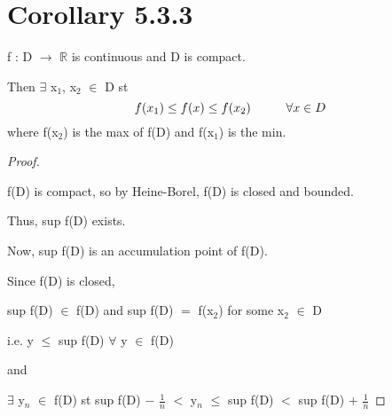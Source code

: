 \documentclass{article}
\newcommand{\mt}[1]{\ensuremath{#1}}
\newcommand\bsc[2][\DefaultOpt]{%
  \def\DefaultOpt{#2}%
  \section[#1]{#2}%
}
\newcommand{\bgpf}{\begin{proof} $ $\newline}
\newcommand{\epf}{\end{proof}}
\newcommand{\br}{\mt{\mathbb{R}} }       %
\newcommand{\fa}{\mt{\forall} }          %
\newcommand{\mem}{\mt{\in} }
\newcommand{\exs}{\mt{\exists} }
\newcommand{\lra}{ \mt{\longrightarrow} } %
\newcommand{\ps}{\mt{+} }
\newcommand{\ms}{\mt{-} }
\newcommand{\ls}{\mt{<} }
\newcommand{\lse}{\mt{\leq} }
\newcommand{\eql}{\mt{=} }
\newcommand{\uw}[2]{#1\mt{_{#2}}}
\newcommand{\frc}[2]{\mt{\frac{#1}{#2}}}
\newcommand{\eqn}[1]{\[#1\]}
\newcommand\tab[1][1cm]{\hspace*{#1}}
\begin{document}
\bsc{Corollary 5.3.3}{

f : D \lra \br is continuous and D is compact.

Then \exs \uw{x}{1}, \uw{x}{2} \mem D st
\eqn{f(x_1) \lse f(x) \lse f(x_2) \tab \fa x \mem D}
where f(\uw{x}{2}) is the max of f(D) and f(\uw{x}{1}) is the min.

\bgpf

f(D) is compact, so by Heine-Borel, f(D) is closed and bounded.

Thus, sup f(D) exists.

Now, sup f(D) is an accumulation point of f(D).

Since f(D) is closed,

sup f(D) \mem f(D) and sup f(D) \eql f(\uw{x}{2}) for some \uw{x}{2} \mem D

i.e. y \lse sup f(D) \fa y \mem f(D)

and

\exs \uw{y}{n} \mem f(D) st sup f(D) \ms \frc{1}{n} \ls \uw{y}{n} \lse sup f(D) \ls sup f(D) \ps \frc{1}{n}

\epf

}
\end{document}
